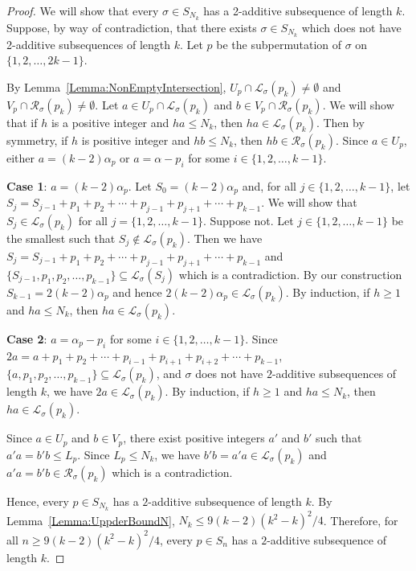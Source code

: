 \documentclass[10pt,a4paper]{amsart}
\newcommand{\cl}{\mathcal{L}}
\newcommand{\crr}{\mathcal{R}}
\begin{document}
\begin{proof}
We will show that every $\sigma\in S_{N_k}$ has a 2-additive subsequence of length $k$. Suppose, by way of contradiction, that there exists $\sigma\in S_{N_k}$ which does not have 2-additive subsequences of length $k$. Let $p$ be the subpermutation of $\sigma$ on $\{1,2,\ldots,2k-1\}$.

By Lemma~\ref{Lemma:NonEmptyIntersection}, $U_p\cap\mathcal{L}_\sigma(p_k)\neq\emptyset$ and $V_p\cap\mathcal{R}_\sigma(p_k)\neq\emptyset$. Let $a\in U_p\cap \cl_\sigma(p_{k})$ and $b\in V_p\cap \crr_\sigma(p_{k})$. We will show that if $h$ is a positive integer and $ha\leq N_k$, then $h a\in \cl_\sigma(p_{k})$. Then by symmetry, if $h$ is positive integer and $hb\leq N_k$, then $h b\in \mathcal{R}_\sigma(p_{k})$. Since $a\in U_p$, either $a=(k-2)\alpha_p$ or $a=\alpha-p_i$ for some $i\in\{1,2,\ldots,k-1\}$.

\textbf{Case 1}: $a=(k-2)\alpha_p$. Let $S_0=(k-2)\alpha_p$ and, for all $j\in\{1,2,\ldots,k-1\}$, let $S_j=S_{j-1}+p_1+p_2+\cdots+p_{j-1}+p_{j+1}+\cdots+p_{k-1}$. We will show that $S_j\in \cl_\sigma(p_{k})$ for all $j=\{1,2,\ldots,k-1\}$. Suppose not. Let $j\in\{1,2,\ldots,k-1\}$ be the smallest such that $S_j\notin \cl_\sigma(p_{k})$. Then we have $S_j=S_{j-1}+p_1+p_2+\cdots+p_{j-1}+p_{j+1}+\cdots+p_{k-1}$ and $\{S_{j-1},p_1,p_2,\ldots,p_{k-1}\}\subseteq\cl_\sigma(S_j)$ which is a contradiction. By our construction $S_{k-1}=2(k-2)\alpha_p$ and hence $2(k-2)\alpha_p\in\cl_\sigma(p_{k})$. By induction, if $h\geq1$ and $ha\leq N_k$, then $ha\in\mathcal{L}_\sigma(p_k)$.

\textbf{Case 2}: $a=\alpha_p-p_i$ for some $i\in\{1,2,\ldots,k-1\}$. Since $2a=a+p_1+p_2+\cdots+p_{i-1}+p_{i+1}+p_{i+2}+\cdots+p_{k-1}$, $\{a,p_1,p_2,\ldots,p_{k-1}\}\subseteq\cl_\sigma(p_k)$, and $\sigma$ does not have $2$-additive subsequences of length $k$, we have $2a\in\mathcal{L}_\sigma(p_k)$. By induction, if $h\geq1$ and $ha\leq N_k$, then $ha\in\mathcal{L}_\sigma(p_k)$.

Since $a\in U_p$ and $b\in V_p$, there exist positive integers $a'$ and $b'$ such that $a'a=b'b\leq L_p$. Since $L_p\leq N_k$, we have $b'b=a'a\in \cl_\sigma(p_{k})$ and $a'a=b'b\in \crr_\sigma(p_{k})$ which is a contradiction.

Hence, every $p\in S_{N_k}$ has a $2$-additive subsequence of length $k$. By Lemma~\ref{Lemma:UppderBoundN}, $N_k\leq 9(k-2)(k^2-k)^2/4$. Therefore, for all $n\geq 9(k-2)(k^2-k)^2/4$, every $p\in S_n$ has a $2$-additive subsequence of length $k$.
\end{proof}
\end{document}
